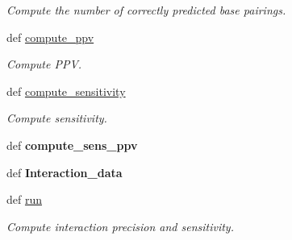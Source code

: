\begin{DoxyCompactItemize}
\begin{DoxyCompactList}\small\item\em \-Compute the number of correctly predicted base pairings. \end{DoxyCompactList}\item 
def \hyperlink{classMycarn__stat_1_1Interaction_1_1Interaction_a1a78d9314711c0161658f04e8dfcc3dc}{compute\-\_\-ppv}
\begin{DoxyCompactList}\small\item\em \-Compute \-P\-P\-V. \end{DoxyCompactList}\item 
def \hyperlink{classMycarn__stat_1_1Interaction_1_1Interaction_a5bc833508e35998f569a9a894d13b43f}{compute\-\_\-sensitivity}
\begin{DoxyCompactList}\small\item\em \-Compute sensitivity. \end{DoxyCompactList}\item 
\hypertarget{classMycarn__stat_1_1Interaction_1_1Interaction_a1460954e81746cedd59df4428032b61a}{
def {\bfseries compute\-\_\-sens\-\_\-ppv}}
\label{classMycarn__stat_1_1Interaction_1_1Interaction_a1460954e81746cedd59df4428032b61a}

\item 
\hypertarget{classMycarn__stat_1_1Interaction_1_1Interaction_a5fbcd5757411f5815e6457b192a9daf5}{
def {\bfseries \-Interaction\-\_\-data}}
\label{classMycarn__stat_1_1Interaction_1_1Interaction_a5fbcd5757411f5815e6457b192a9daf5}

\item 
\hypertarget{classMycarn__stat_1_1Interaction_1_1Interaction_a41e6b6cf41e16d42544a862d6336e10a}{
def \hyperlink{classMycarn__stat_1_1Interaction_1_1Interaction_a41e6b6cf41e16d42544a862d6336e10a}{run}}
\label{classMycarn__stat_1_1Interaction_1_1Interaction_a41e6b6cf41e16d42544a862d6336e10a}

\begin{DoxyCompactList}\small\item\em \-Compute interaction precision and sensitivity. \end{DoxyCompactList}\end{DoxyCompactItemize}
